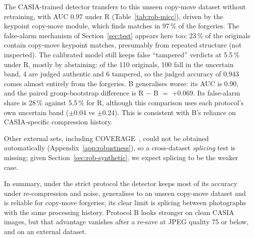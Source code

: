 The CASIA-trained detector transfers to this unseen copy-move dataset without retraining, with AUC 0.97 under R
(Table~\ref{tab:rob-micc}), driven by the keypoint copy-move module, which finds matches in 97\,\% of the
forgeries. The false-alarm mechanism of Section~\ref{sec:test} appears here too: 23\,\% of the originals contain
copy-move keypoint matches, presumably from repeated structure (not inspected). The calibrated model still keeps
false ``tampered'' verdicts at 5.5\,\% under R, mostly by abstaining: of the 110 originals, 100 fall in the
uncertain band, 4 are judged authentic and 6 tampered, so the judged accuracy of 0.943 comes almost entirely from
the forgeries. B generalises worse: its AUC is 0.90, and the paired group-bootstrap difference is
R $-$ B $=$ +0.069. Its false-alarm share is 28\,\% against 5.5\,\% for R, although this
comparison uses each protocol's own uncertain band ($\pm0.04$ vs $\pm0.24$). This is consistent with B's reliance
on CASIA-specific compression history.

Other external sets, including COVERAGE~\cite{wen2016coverage}, could not be obtained automatically
(Appendix~\ref{app:robustness}), so a cross-dataset \emph{splicing} test is missing; given
Section~\ref{sec:rob-synthetic}, we expect splicing to be the weaker case.

In summary, under the strict protocol the detector keeps most of its accuracy under re-compression and noise,
generalises to an unseen copy-move dataset and is reliable for copy-move forgeries; its clear limit is splicing
between photographs with the same processing history. Protocol B looks stronger on clean CASIA images, but that
advantage vanishes after a re-save at JPEG quality 75 or below, and on an external dataset.
